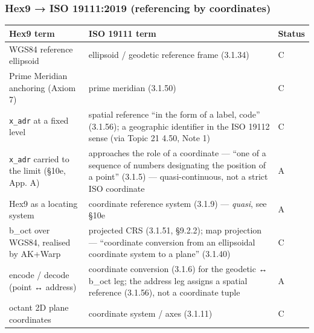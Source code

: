 \documentclass[
  11pt,
  a4paper,
]{article}
\newcounter{none} %
\begin{document}
\subsubsection{Hex9 → ISO 19111:2019 (referencing by
coordinates)}\label{hex9-iso-191112019-referencing-by-coordinates}

{\def\LTcaptype{none} %
\begin{longtable}[]{@{}
  >{\raggedright\arraybackslash}p{}
  >{\raggedright\arraybackslash}p{}
  >{\raggedright\arraybackslash}p{}@{}}
\toprule\noalign{}
\begin{minipage}[b]{\linewidth}\raggedright
Hex9 term
\end{minipage} & \begin{minipage}[b]{\linewidth}\raggedright
ISO 19111 term
\end{minipage} & \begin{minipage}[b]{\linewidth}\raggedright
Status
\end{minipage} \\
\midrule\noalign{}
\endhead
\bottomrule\noalign{}
\endlastfoot
WGS84 reference ellipsoid & ellipsoid / geodetic reference frame
(3.1.34) & C \\
Prime Meridian anchoring (Axiom 7) & prime meridian (3.1.50) & C \\
\texttt{x\_adr} at a fixed level & spatial reference ``in the form of a
label, code'' (3.1.56); a geographic identifier in the ISO 19112 sense
(via Topic 21 4.50, Note 1) & C \\
\texttt{x\_adr} carried to the limit (§10e, App. A) & approaches the
role of a coordinate --- ``one of a sequence of numbers designating the
position of a point'' (3.1.5) --- quasi-continuous, not a strict ISO
coordinate & A \\
Hex9 as a locating system & coordinate reference system (3.1.9) ---
\emph{quasi}, see §10e & A \\
b\_oct over WGS84, realised by AK+Warp & projected CRS (3.1.51, §9.2.2);
map projection --- ``coordinate conversion from an ellipsoidal
coordinate system to a plane'' (3.1.40) & C \\
encode / decode (point ↔ address) & coordinate conversion (3.1.6) for
the geodetic ↔ b\_oct leg; the address leg assigns a spatial reference
(3.1.56), not a coordinate tuple & A \\
octant 2D plane coordinates & coordinate system / axes (3.1.11) & C \\
\end{longtable}
}
\end{document}
